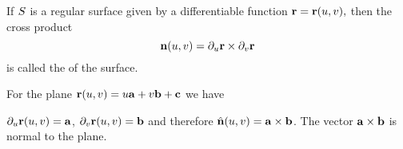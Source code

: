 \begin{df}
 If $S$ is a regular surface given by a differentiable function $\mathbf{ r}=\mathbf{ r}(u,v),$ then the cross product
\[\mathbf{ n}(u,v)=\partial_u \mathbf{ r}\times \partial_v \mathbf{ r}\]
is called the  of the surface.
\end{df}





\begin{exa}
  For the plane $\mathbf{ r}(u,v)=u\mathbf{ a}+v\mathbf{ b}+\mathbf{ c}$ we have

$\partial_u \mathbf{ r}(u,v)=\mathbf{ a}$, $\partial_v \mathbf{ r}(u,v)=\mathbf{ b}$ and therefore $\hat{ \mathbf{ n}}(u,v)=\mathbf{ a}\times
\mathbf{ b}$. The vector $\mathbf{ a}\times \mathbf{ b}$ is normal to the plane.
\end{exa}


